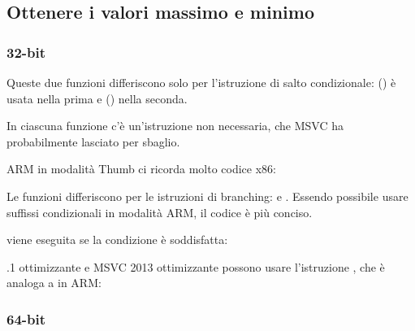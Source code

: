 \subsection{Ottenere i valori massimo e minimo}

\subsubsection{32-bit}






Queste due funzioni differiscono solo per l'istruzione di salto condizionale: 
 () è usata nella prima
e  () nella seconda.

\myindex{\CompilerAnomaly}
\label{MSVC_double_JMP_anomaly}

In ciascuna funzione c'è un'istruzione \JMP non necessaria, che MSVC ha probabilmente lasciato per sbaglio.


ARM in modalità Thumb ci ricorda molto codice x86:




Le funzioni differiscono per le istruzioni di branching:  e .
Essendo possibile usare suffissi condizionali in modalità ARM, il codice è più conciso.

 viene eseguita se la condizione è soddisfatta:



.1 ottimizzante e MSVC 2013 ottimizzante possono usare l'istruzione , che è analoga a  in ARM:



\subsubsection{64-bit}

